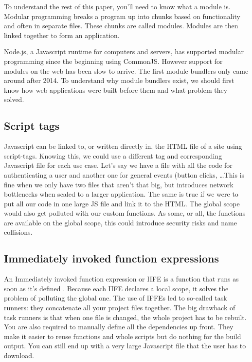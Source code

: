 To understand the rest of this paper, you’ll need to know what a module is. Modular programming breaks a program up into chunks based on functionality and often in separate files. These chunks are called modules. Modules are then linked together to form an application. \autocite{webpack-no-dateB} \autocite{mozilla-2021A}

Node.js, a Javascript runtime for computers and servers, has supported modular programming since the beginning using CommonJS. However support for modules on the web has been slow to arrive. The first module bundlers only came around after 2014. To understand why module bundlers exist, we should first know how web applications were built before them and what problem they solved. \autocite{webpack-no-dateA}

\subsection{Script tags}

Javascript can be linked to, or written directly in, the HTML file of a site using script-tags. Knowing this, we could use a different tag and corresponding Javascript file for each use case. Let’s say we have a file with all the code for authenticating a user and another one for general events (button clicks, \ldots This is fine when we only have two files that aren’t that big, but introduces network bottlenecks when scaled to a larger application. The same is true if we were to put all our code in one large JS file and link it to the HTML. The global scope would also get polluted with our custom functions. As some, or all, the functions are available on the global scope, this could introduce security risks and name collisions. 



\subsection{Immediately invoked function expressions}

An Immediately invoked function expression or IIFE is a function that runs as soon as it’s defined \autocite{mozilla-2021B}. Because each IIFE declares a local scope, it solves the problem of polluting the global one. The use of IFFEs led to so-called task runners: they concatenate all your project files together. The big drawback of task runners is that when one file is changed, the whole project has to be rebuilt. You are also required to manually define all the dependencies up front. They make it easier to reuse functions and whole scripts but do nothing for the build output. You can still end up with a very large Javascript file that the user has to download. 

